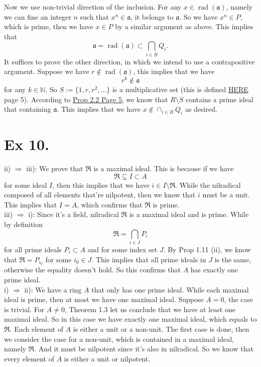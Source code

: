 Now we use non-trivial direction of the inclusion. For any $x\in \operatorname{rad}(\mathfrak a)$, namely we can fine an integer $n$ such that $x^n\in \mathfrak a$, it belongs to $\mathfrak a$. So we have $x^n\in P$, which is prime, then we have $x\in P$ by a similar argument as above. This implies that 
$$\mathfrak a=\operatorname{rad}(\mathfrak a)\subset \bigcap_{i\in B}Q_i.$$
It suffices to prove the other direction, in which we intend to use a contrapositive argument. Suppose we have $r\notin \operatorname{rad}(\mathfrak a)$, this implies that we have 
$$r^k\notin \mathfrak a$$ for any $k\in \mathbb N$. So $S:=\{1,r,r^2,...\}$ is a multiplicative set (this is defined \href{https://www.jmilne.org/math/xnotes/CA.pdf}{HERE} page 5). 
According to \href{https://www.jmilne.org/math/xnotes/CA.pdf}{Prop 2.2 Page 5}, we know that $R\setminus S$ contains a prime ideal that containing $\mathfrak a$. This implies that we have $x\notin \cap_{i\in B}Q_i$ as desired.



\section{Ex 10.}

ii) $\Rightarrow$ iii): We prove that $\mathfrak R$ is a maximal ideal. This is because if we have
$$\mathfrak R\subsetneq I\subset A$$ for some ideal $I$, then this implies that we have $i\in I\setminus \mathfrak R$. While the nilradical composed of all elements that're nilpotent, then we know that $i$ must be a unit. This implies that $I=A$, which confirms that $\mathfrak R$ is prime.\\

\noindent iii) $\Rightarrow$ i): Since it's a field, nilradical $\mathfrak R$ is a maximal ideal and is prime.
While by definition 
$$\mathfrak R=\bigcap_{i\in J} P_i$$ for all prime ideals $P_i\subset A$ and for some index set $J$. By Prop 1.11 (ii), we know that $\mathfrak R=P_{i_0}$ for some $i_0\in J$. This implies that all prime ideals in $J$ is the same, otherwise the equality doesn't hold. So this confirms that $A$ has exactly one prime ideal.\\

\noindent i) $\Rightarrow$ ii): We have a ring $A$ that only has one prime ideal. While each maximal ideal is prime, then at most we have one maximal ideal. Suppose $A=0$, the case is trivial. For $A\neq 0$, Theorem 1.3 let us conclude that we have at least one maximal ideal. So in this case we have exactly one maximal ideal, which equals to $\mathfrak R$. Each element of $A$ is either a unit or a non-unit. The first case is done, then we consider the case for a non-unit, which is contained in a maximal ideal, namely $\mathfrak R$. And it must be nilpotent since it's also in nilradical. So we know that every element of $A$ is either a unit or nilpotent.

